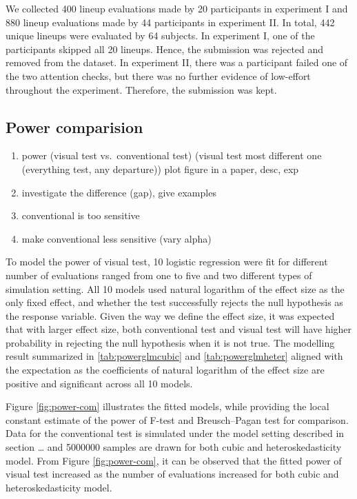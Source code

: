 \documentclass[]{interact}
\theoremstyle{plain}%
\theoremstyle{definition}
\theoremstyle{remark}
\def\tightlist{}
\begin{document}
We collected 400 lineup evaluations made by 20 participants in
experiment I and 880 lineup evaluations made by 44 participants in
experiment II. In total, 442 unique lineups were evaluated by 64
subjects. In experiment I, one of the participants skipped all 20
lineups. Hence, the submission was rejected and removed from the
dataset. In experiment II, there was a participant failed one of the two
attention checks, but there was no further evidence of low-effort
throughout the experiment. Therefore, the submission was kept.

\hypertarget{power-comparision}{%
\subsection{Power comparision}\label{power-comparision}}

\begin{enumerate}
\def\labelenumi{\arabic{enumi}.}
\tightlist
\item
  power (visual test vs.~conventional test) (visual test most different
  one (everything test, any departure)) plot figure in a paper, desc,
  exp
\item
  investigate the difference (gap), give examples
\item
  conventional is too sensitive
\item
  make conventional less sensitive (vary alpha)
\end{enumerate}

To model the power of visual test, 10 logistic regression were fit for
different number of evaluations ranged from one to five and two
different types of simulation setting. All 10 models used natural
logarithm of the effect size as the only fixed effect, and whether the
test successfully rejects the null hypothesis as the response variable.
Given the way we define the effect size, it was expected that with
larger effect size, both conventional test and visual test will have
higher probability in rejecting the null hypothesis when it is not true.
The modelling result summarized in \ref{tab:powerglmcubic} and
\ref{tab:powerglmheter} aligned with the expectation as the coefficients
of natural logarithm of the effect size are positive and significant
across all 10 models.

Figure \ref{fig:power-com} illustrates the fitted models, while
providing the local constant estimate of the power of F-test and
Breusch--Pagan test for comparison. Data for the conventional test is
simulated under the model setting described in section \ldots{} and
5000000 samples are drawn for both cubic and heteroskedasticity model.
From Figure \ref{fig:power-com}, it can be observed that the fitted
power of visual test increased as the number of evaluations increased
for both cubic and heteroskedasticity model.
\end{document}
